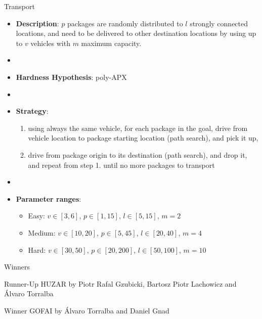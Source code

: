 \documentclass[aspectratio=169,xcolor=dvipsnames]{beamer}
\begin{document}
\begin{frame}{Transport}

    \begin{itemize}
        \item \textbf{Description}:  $p$ packages are randomly distributed to $l$ strongly connected locations, and need to be delivered to other destination locations by using up to $v$ vehicles with $m$ maximum capacity.
        \item[]
        \item \textbf{Hardness Hypothesis}: poly-APX %
        \item[]
        \item \textbf{Strategy}:
        \begin{enumerate}
            \item using always the same vehicle, for each package in the goal, drive from vehicle location to package starting location (path search), and pick it up,
            \item drive from package origin to its destination (path search), and drop it, and repeat from step 1. until no more packages to transport
        \end{enumerate}
        \item[]
        \item \textbf{Parameter ranges}:
        \begin{itemize}
            \item Easy: $v\in[3, 6]$, $p\in[1, 15]$, $l\in[5, 15]$, $m=2$
            \item Medium: $v\in[10, 20]$, $p\in[5, 45]$, $l\in[20, 40]$, $m=4$
            \item Hard: $v\in[30, 50]$, $p\in[20, 200]$, $l\in[50, 100]$, $m=10$
        \end{itemize}
    \end{itemize}

\end{frame}

\begin{frame}{Winners}

    \pause

    \begin{block}{Runner-Up}
        \alert{HUZAR} by Piotr Rafal Gzubicki, Bartosz Piotr Lachowicz and Álvaro Torralba
    \end{block}

    \pause
    \bigskip

    \begin{block}{Winner}
        \alert{GOFAI} by Álvaro Torralba and Daniel Gnad
    \end{block}
\end{frame}

\end{document}
